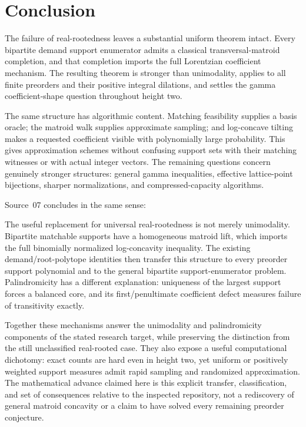 \documentclass[11pt]{article}
\numberwithin{equation}{section}
\theoremstyle{definition}
\begin{document}
\section{Conclusion}
\label{lor:sec:conclusion}
The failure of real-rootedness leaves a substantial uniform theorem intact.
Every bipartite demand support enumerator admits a classical
transversal-matroid completion, and that completion imports the full
Lorentzian coefficient mechanism. The resulting theorem is stronger than
unimodality, applies to all finite preorders and their positive integral
dilations, and settles the gamma coefficient-shape question throughout
height two.

The same structure has algorithmic content. Matching feasibility supplies
a basis oracle; the matroid walk supplies approximate sampling; and
log-concave tilting makes a requested coefficient visible with
polynomially large probability. This gives approximation schemes without
confusing support sets with their matching witnesses or with actual
integer vectors. The remaining questions concern genuinely stronger
structures: general gamma inequalities, effective lattice-point
bijections, sharper normalizations, and compressed-capacity algorithms.

Source~07 concludes in the same sense:

The useful replacement for universal real-rootedness is not merely
unimodality. Bipartite matchable supports have a homogeneous matroid lift,
which imports the full binomially normalized log-concavity inequality. The
existing demand/root-polytope identities then transfer this structure to every
preorder support polynomial and to the general bipartite support-enumerator
problem. Palindromicity has a different explanation: uniqueness of the largest
support forces a balanced core, and its first/penultimate coefficient defect
measures failure of transitivity exactly.

Together these mechanisms answer the unimodality and palindromicity components
of the stated research target, while preserving the distinction from the still
unclassified real-rooted case. They also expose a useful computational
dichotomy: exact counts are hard even in height two, yet uniform or positively
weighted support measures admit rapid sampling and randomized approximation.
The mathematical advance claimed here is this explicit transfer, classification,
and set of consequences relative to the inspected repository, not a rediscovery
of general matroid concavity or a claim to have solved every remaining preorder
conjecture.
\end{document}
